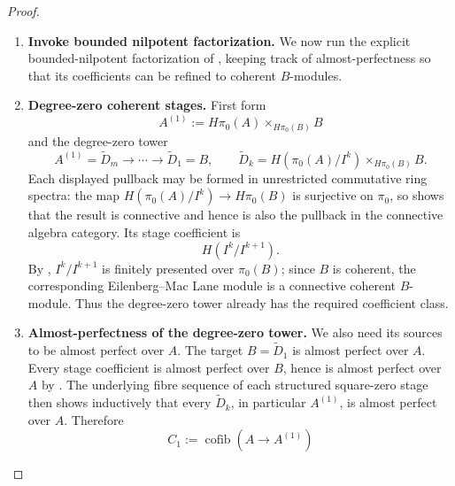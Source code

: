 \begin{proof}
\begin{enumerate}[label=\textup{(\arabic*)}]
    only a canonical quotient
    \[
        \pi_0\operatorname{fib}(A\to B)\twoheadrightarrow I;
    \]
    we never identify these two modules. By
    , the ordinary ring \(\pi_0(A)\) is
    coherent, every \(I^k\) is finitely presented, and for every finitely presented
    \(\pi_0(A)\)-module \(N\) the pieces
    \[
        I^kN/I^{k+1}N
    \]
    are finitely presented over \(\pi_0(B)\). At this point the available coherence input concerns the ordinary ring
    \(\pi_0(A)\), and the following construction uses precisely that input.
    \item \textbf{Invoke bounded nilpotent factorization.}
    We now run the explicit bounded-nilpotent factorization of
    , keeping track of
    almost-perfectness so that its coefficients can be refined to coherent
    \(B\)-modules.
    \item \textbf{Degree-zero coherent stages.}
    First form
    \[
        A^{(1)}
        :=
        H\pi_0(A)\times_{H\pi_0(B)}B
    \]
    and the degree-zero tower
    \[
        A^{(1)}=\widetilde D_m
        \longrightarrow\cdots\longrightarrow
        \widetilde D_1=B,
        \qquad
        \widetilde D_k
        =H(\pi_0(A)/I^k)\times_{H\pi_0(B)}B.
    \]
    Each displayed pullback may be formed in unrestricted commutative ring
    spectra: the map
    \(H(\pi_0(A)/I^k)\to H\pi_0(B)\) is surjective on \(\pi_0\), so
     shows that the result is
    connective and hence is also the pullback in the connective algebra
    category. Its stage coefficient is
    \[
        H(I^k/I^{k+1}).
    \]
    By , \(I^k/I^{k+1}\) is finitely
    presented over \(\pi_0(B)\); since \(B\) is coherent, the corresponding
    Eilenberg--Mac Lane module is a connective coherent \(B\)-module. Thus the
    degree-zero tower already has the required coefficient class.
    \item \textbf{Almost-perfectness of the degree-zero tower.}
    We also need its sources to be almost perfect over \(A\). The target
    \(B=\widetilde D_1\) is almost perfect over \(A\). Every stage coefficient is
    almost perfect over \(B\), hence is almost perfect over \(A\) by
    . The underlying fibre sequence
    of each structured square-zero stage then shows inductively that every \(\widetilde D_k\),
    in particular \(A^{(1)}\), is almost perfect over \(A\). Therefore
    \[
        C_1:=\operatorname{cofib}(A\to A^{(1)})
\]
\end{enumerate}
\end{proof}
